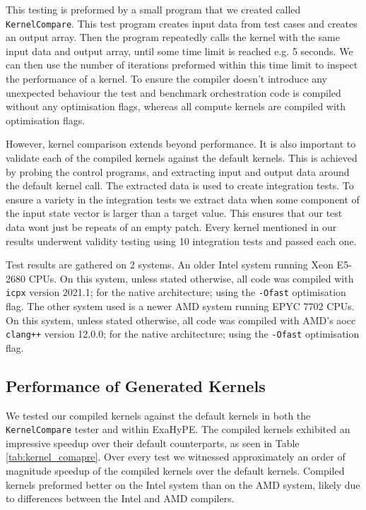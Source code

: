 This testing is preformed by a small program that we created called \texttt{KernelCompare}.
This test program creates input data from test cases and creates an output array.
Then the program repeatedly calls the kernel with the same input data and output array, until some time limit is reached e.g. 5 seconds.
We can then use the number of iterations preformed within this time limit to inspect the performance of a kernel.
To ensure the compiler doesn't introduce any unexpected behaviour the test and benchmark orchestration code is compiled without any optimisation flags, whereas all compute kernels are compiled with optimisation flags.

However, kernel comparison extends beyond performance.
It is also important to validate each of the compiled kernels against the default kernels.
This is achieved by probing the control programs, and extracting input and output data around the default kernel call.
The extracted data is used to create integration tests.
To ensure a variety in the integration tests we extract data when some component of the input state vector is larger than a target value. 
This ensures that our test data wont just be repeats of an empty patch.
Every kernel mentioned in our results underwent validity testing using 10 integration tests and passed each one.

Test results are gathered on 2 systems.
An older Intel system running Xeon E5-2680 CPUs.
On this system, unless stated otherwise, all code was compiled with \texttt{icpx} version 2021.1; for the native architecture; using the \texttt{-Ofast} optimisation flag.
The other system used is a newer AMD system running EPYC 7702 CPUs.
On this system, unless stated otherwise, all code was compiled with AMD's aocc \texttt{clang++} version 12.0.0; for the native architecture; using the \texttt{-Ofast} optimisation flag. 

\subsection{Performance of Generated Kernels}

We tested our compiled kernels against the default kernels in both the \texttt{KernelCompare} tester and within ExaHyPE.
The compiled kernels exhibited an impressive speedup over their default counterparts, as seen in Table \ref{tab:kernel_comapre}.
Over every test we witnessed approximately an order of magnitude speedup of the compiled kernels over the default kernels.
Compiled kernels preformed better on the Intel system than on the AMD system, likely due to differences between the Intel and AMD compilers. 

